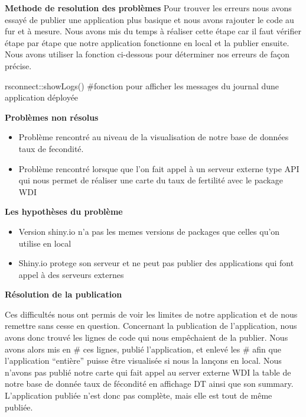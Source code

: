 \documentclass[
]{article}
\newenvironment{Shaded}{}{}
\newcommand{\CommentTok}[1]{\textcolor[rgb]{0.00,0.50,0.00}{#1}}
\newcommand{\FunctionTok}[1]{#1}
\newcommand{\NormalTok}[1]{#1}
\newcommand{\SpecialCharTok}[1]{\textcolor[rgb]{0.00,0.50,0.50}{#1}}
\providecommand{\tightlist}{%
  \setlength{\itemsep}{0pt}\setlength{\parskip}{0pt}}
\begin{document}
\textbf{Methode de resolution des problèmes} \newline Pour trouver les
erreurs nous avons essayé de publier une application plus basique et
nous avons rajouter le code au fur et à mesure. Nous avons mis du temps
à réaliser cette étape car il faut vérifier étape par étape que notre
application fonctionne en local et la publier ensuite. Nous avons
utiliser la fonction ci-dessous pour déterminer nos erreurs de façon
précise.

\begin{Shaded}
\begin{Highlighting}[]
\NormalTok{rsconnect}\SpecialCharTok{::}\FunctionTok{showLogs}\NormalTok{() }\CommentTok{\#fonction pour afficher les messages du journal d\textquotesingle{}une application déployée}
\end{Highlighting}
\end{Shaded}

\textbf{Problèmes non résolus}

\begin{itemize}
\tightlist
\item
  Problème rencontré au niveau de la visualisation de notre base de
  données taux de fecondité.
\item
  Problème rencontré lorsque que l'on fait appel à un serveur externe
  type API qui nous permet de réaliser une carte du taux de fertilité
  avec le package WDI
\end{itemize}

\textbf{Les hypothèses du problème}

\begin{itemize}
\tightlist
\item
  Version shiny.io n'a pas les memes versions de packages que celles
  qu'on utilise en local
\item
  Shiny.io protege son serveur et ne peut pas publier des applications
  qui font appel à des serveurs externes
\end{itemize}

\textbf{Résolution de la publication}

Ces difficultés nous ont permis de voir les limites de notre application
et de nous remettre sans cesse en question. Concernant la publication de
l'application, nous avons donc trouvé les lignes de code qui nous
empêchaient de la publier. Nous avons alors mis en \# ces lignes, publié
l'application, et enlevé les \# afin que l'application ``entière''
puisse être visualisée si nous la lançons en local. Nous n'avons pas
publié notre carte qui fait appel au server externe WDI la table de
notre base de donnée taux de fécondité en affichage DT ainsi que son
summary. L'application publiée n'est donc pas complète, mais elle est
tout de même publiée.
\end{document}
